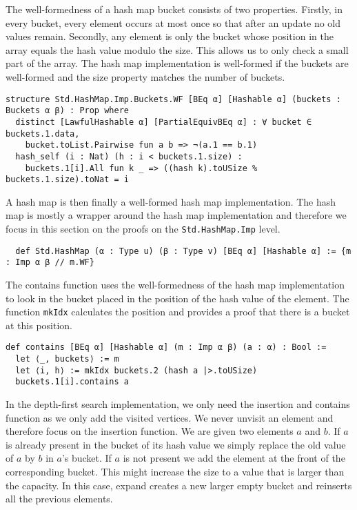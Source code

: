 The well-formedness of a hash map bucket consists of two properties. Firstly, in every bucket, every element occurs at most once so that after an update no old values remain. Secondly, any element is only the bucket whose position in the array equals the hash value modulo the size. This allows us to only check a small part of the array. The hash map implementation is well-formed if the buckets are well-formed and the size property matches the number of buckets.

\begin{lstlisting}
structure Std.HashMap.Imp.Buckets.WF [BEq α] [Hashable α] (buckets : Buckets α β) : Prop where
  distinct [LawfulHashable α] [PartialEquivBEq α] : ∀ bucket ∈ buckets.1.data,
    bucket.toList.Pairwise fun a b => ¬(a.1 == b.1)
  hash_self (i : Nat) (h : i < buckets.1.size) :
    buckets.1[i].All fun k _ => ((hash k).toUSize % buckets.1.size).toNat = i
\end{lstlisting}

A hash map is then finally a well-formed hash map implementation. The hash map is mostly a wrapper around the hash map implementation and therefore we focus in this section on the proofs on the \lstinline|Std.HashMap.Imp| level.

\begin{lstlisting}
  def Std.HashMap (α : Type u) (β : Type v) [BEq α] [Hashable α] := {m : Imp α β // m.WF}
\end{lstlisting}

The contains function uses the well-formedness of the hash map implementation to look in the bucket placed in the position of the hash value of the element. The function \lstinline|mkIdx| calculates the position and provides a proof that there is a bucket at this position.

\begin{lstlisting}
def contains [BEq α] [Hashable α] (m : Imp α β) (a : α) : Bool :=
  let ⟨_, buckets⟩ := m
  let ⟨i, h⟩ := mkIdx buckets.2 (hash a |>.toUSize)
  buckets.1[i].contains a
\end{lstlisting}

In the depth-first search implementation, we only need the insertion and contains function as we only add the visited vertices. We never unvisit an element and therefore focus on the insertion function. We are given two elements $a$ and $b$. If $a$ is already present in the bucket of its hash value we simply replace the old value of $a$ by $b$ in $a$'s bucket. If $a$ is not present we add the element at the front of the corresponding bucket. This might increase the size to a value that is larger than the capacity. In this case, expand creates a new larger empty bucket and reinserts all the previous elements.

